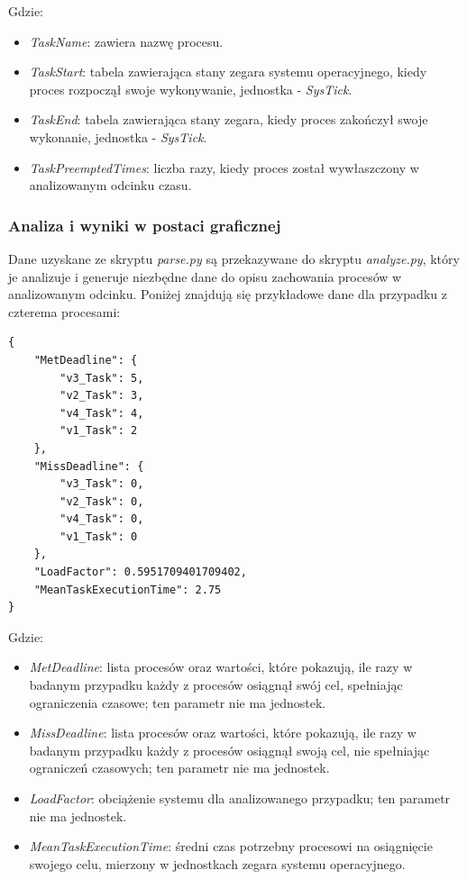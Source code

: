 \documentclass[../../main]{subfiles}
\begin{document}
Gdzie:

\begin{itemize}
    \item \textit{TaskName}: zawiera nazwę procesu.
    \item \textit{TaskStart}: tabela zawierająca stany zegara systemu operacyjnego, kiedy proces rozpoczął swoje wykonywanie, jednostka - \textit{SysTick}.
    \item \textit{TaskEnd}: tabela zawierająca stany zegara, kiedy proces zakończył swoje wykonanie, jednostka - \textit{SysTick}.
    \item \textit{TaskPreemptedTimes}: liczba razy, kiedy proces został wywłaszczony w analizowanym odcinku czasu.
\end{itemize}

\subsubsection{Analiza i wyniki w postaci graficznej}

Dane uzyskane ze skryptu \textit{parse.py} są przekazywane do skryptu \textit{analyze.py}, który je analizuje i generuje niezbędne dane do opisu zachowania procesów w analizowanym odcinku. Poniżej znajdują się przykładowe dane dla przypadku z czterema procesami:

\begin{lstlisting}[caption={Przykładowe wyniki analizy dla czterech procesów}, label={lst:example-process-analisys}]
{
    "MetDeadline": {
        "v3_Task": 5,
        "v2_Task": 3,
        "v4_Task": 4,
        "v1_Task": 2
    },
    "MissDeadline": {
        "v3_Task": 0,
        "v2_Task": 0,
        "v4_Task": 0,
        "v1_Task": 0
    },
    "LoadFactor": 0.5951709401709402,
    "MeanTaskExecutionTime": 2.75
}
\end{lstlisting}

Gdzie:

\begin{itemize}
    \item \textit{MetDeadline}: lista procesów oraz wartości, które pokazują, ile razy w badanym przypadku każdy z procesów osiągnął swój cel, spełniając ograniczenia czasowe; ten parametr nie ma jednostek.
    \item \textit{MissDeadline}: lista procesów oraz wartości, które pokazują, ile razy w badanym przypadku każdy z procesów osiągnął swoją cel, nie spełniając ograniczeń czasowych; ten parametr nie ma jednostek.
    \item \textit{LoadFactor}: obciążenie systemu dla analizowanego przypadku; ten parametr nie ma jednostek.
    \item \textit{MeanTaskExecutionTime}: średni czas potrzebny procesowi na osiągnięcie swojego celu, mierzony w jednostkach zegara systemu operacyjnego. 
\end{itemize}
\end{document}
